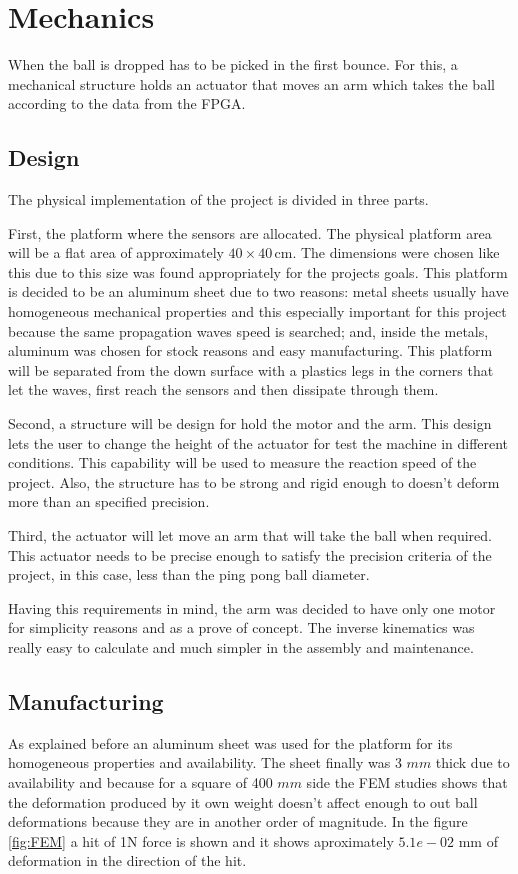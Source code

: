 \chapter{Mechanics} %
\label{chap:mechanics}
	When the ball is dropped has to be picked in the first bounce. 
	For this, a mechanical structure holds an actuator that moves an arm which takes the ball according to the data from the FPGA.

	\section{Design} %
	\label{sec:mechanics_design}
		The physical implementation of the project is divided in three parts.

		First, the platform where the sensors are allocated. 
		The physical platform area will be a flat area of approximately $40\times40\,\si{\centi\meter}$.
		The dimensions were chosen like this due to this size was found appropriately for the projects goals.
		This platform is decided to be an aluminum sheet due to two reasons: metal sheets usually have homogeneous mechanical properties and this especially important for this project because the same propagation waves speed is searched; and, inside the metals, aluminum was chosen for stock reasons and easy manufacturing. 
		This platform will be separated from the down surface with a plastics legs in the corners that let the waves, first reach the sensors and then dissipate through them.

		Second, a structure will be design for hold the motor and the arm. 
		This design lets the user to change the height of the actuator for test the machine in different conditions. 
		This capability will be used to measure the reaction speed of the project. 
		Also, the structure has to be strong and rigid enough to doesn't deform more than an specified precision.

		Third, the actuator will let move an arm that will take the ball when required. 
		This actuator needs to be precise enough to satisfy the precision criteria of the project, in this case, less than the ping pong ball diameter. 
			
		Having this requirements in mind, the arm was decided to have only one motor for simplicity reasons and as a prove of concept. 
		The inverse kinematics was really easy to calculate and much simpler in the assembly and maintenance.
	
	\section{Manufacturing} %
	\label{sec:mechanics_manufacturing}
		As explained before an aluminum sheet was used for the platform for its homogeneous properties and availability. 
		The sheet finally was 3 $mm$ thick due to availability and because for a square of 400 $mm$ side the FEM studies shows that the deformation produced by it own weight doesn't affect enough to out ball deformations because they are in another order of magnitude. 
		In the figure \ref{fig:FEM} a hit of 1N force is shown and it shows aproximately $5.1e-02$ mm of deformation in the direction of the hit.

